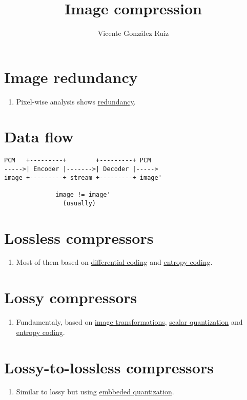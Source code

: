 
\title{Image compression}

\author{Vicente González Ruiz}

\maketitle

\section{Image redundancy}
\begin{enumerate}
\item Pixel-wise analysis shows \href{https://vicente-gonzalez-ruiz.github.io/image_redundancies/}{redundancy}.
\end{enumerate}

\section{Data flow~\cite{sayood2017introduction}}

\begin{verbatim}
PCM   +---------+        +---------+ PCM
----->| Encoder |------->| Decoder |----->
image +---------+ stream +---------+ image'

              image != image'
                (usually)
\end{verbatim}

\section{Lossless compressors}
\begin{enumerate}
\item Most of them based on \href{https://vicente-gonzalez-ruiz.github.io/differential_coding/}{differential coding} and \href{https://vicente-gonzalez-ruiz.github.io/symbol_compression/}{entropy coding}.
\end{enumerate}

\section{Lossy compressors}
\begin{enumerate}
\item Fundamentaly, based on \href{https://vicente-gonzalez-ruiz.github.io/image_transformations_for_coding/}{image transformations}, \href{https://vicente-gonzalez-ruiz.github.io/quantization/}{scalar quantization} and \href{https://vicente-gonzalez-ruiz.github.io/symbol_compression/}{entropy coding}.
\end{enumerate}

\section{Lossy-to-lossless compressors}
\begin{enumerate}
\item Similar to lossy but using \href{}{embbeded quantization}.
\end{enumerate}


